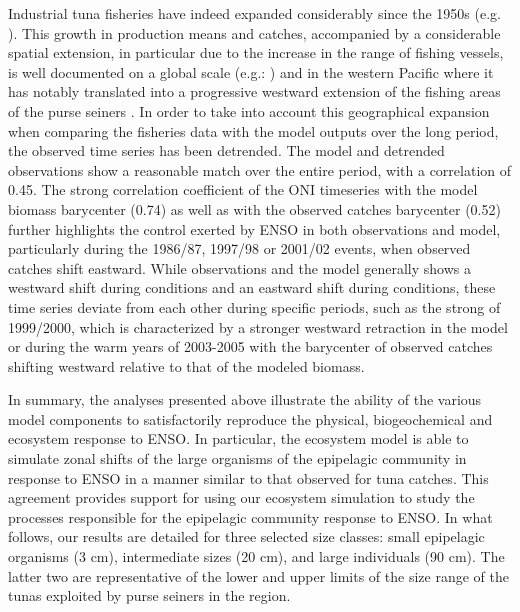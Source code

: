 Industrial tuna fisheries have indeed expanded considerably since the 1950s (e.g. \citealt{ticklerFarHomeDistance2018, faoStateWorldFisheries2022}). This growth in production means and catches, accompanied by a considerable spatial extension, in particular due to the increase in the range of fishing vessels, is well documented on a global scale (e.g.: \citealt{fonteneauAtlasTropicalTuna1998}) and in the western Pacific \citep{lodgeDevelopmentPalauArrangement1998, williamsOverviewTunaFisheries2021} where it has notably translated into a progressive westward extension of the fishing areas of the purse seiners \citep{fonteneauAtlasTropicalTuna1998}. In order to take into account this geographical expansion when comparing the fisheries data with the model outputs over the long period, the observed time series has been detrended. The model and detrended observations show a reasonable match over the entire period, with a correlation of 0.45. The strong correlation coefficient of the ONI timeseries with the model biomass barycenter (0.74) as well as with the observed catches barycenter (0.52) further highlights the control exerted by ENSO in both observations and model, particularly during the 1986/87, 1997/98 or 2001/02 \nino{} events, when observed catches shift eastward. While observations and the model generally shows a westward shift during \nina{} conditions and an eastward shift during \nino{} conditions, these time series deviate from each other during specific periods, such as the strong \nina{} of 1999/2000, which is characterized by a stronger westward retraction in the model or during the warm years of 2003-2005 with the barycenter of observed catches shifting westward relative to that of the modeled biomass.

In summary, the analyses presented above illustrate the ability of the various model components to satisfactorily reproduce the physical, biogeochemical and ecosystem response to ENSO. In particular, the ecosystem model is able to simulate zonal shifts of the large organisms of the epipelagic community in response to ENSO in a manner similar to that observed for tuna catches. This agreement provides support for using our ecosystem simulation to study the processes responsible for the epipelagic community response to ENSO. In what follows, our results are detailed for three selected size classes: small epipelagic organisms (3 cm), intermediate sizes (20 cm), and large individuals (90 cm). The latter two are representative of the lower and upper limits of the size range of the tunas exploited by purse seiners in the region.

